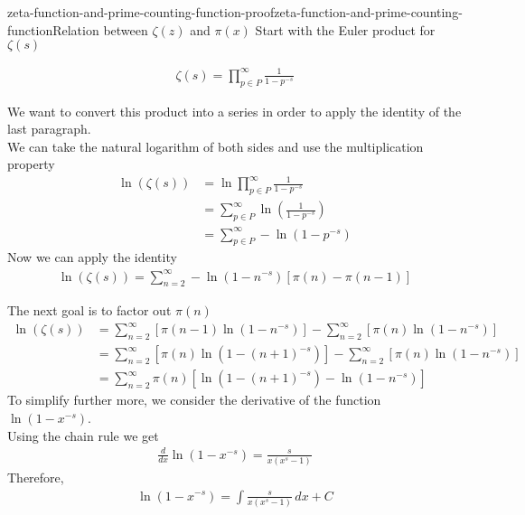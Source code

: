 \documentclass[preview]{standalone}
\begin{document}
\begin{snippetproof}{zeta-function-and-prime-counting-function-proof}{zeta-function-and-prime-counting-function}{Relation between \(\zeta(z)\) and \(\pi(x)\)}
    Start with the Euler product for \(\zeta(s)\)

    \begin{align*}
        \zeta (s)=\prod_{p\in P}^{\infty}\frac{1}{1-p^{-s}}
    \end{align*}
    
    We want to convert this product into a series in order to apply the identity of the last paragraph.
    \\
    We can take the natural logarithm of both sides and use the multiplication property
    \begin{align*}
        \ln\left(\zeta (s)\right)&=\ln\prod_{p\in P}^{\infty}\frac{1}{1-p^{-s}}
        \\
        &=\sum_{p\in P}^{\infty}\ln\left(\frac{1}{1-p^{-s}}\right)
        \\
        &=\sum_{p\in P}^{\infty}-\ln\left(1-p^{-s}\right)
    \end{align*}
    Now we can apply the identity
    \begin{align*}
        \ln\left(\zeta (s)\right)=\sum_{n=2}^{\infty}-\ln\left(1-n^{-s}\right)\left[\pi (n) - \pi (n-1)\right]
    \end{align*}
    
    The next goal is to factor out \(\pi (n)\)
    \begin{align*}
        \ln\left(\zeta(s)\right)
        &=\sum_{n=2}^{\infty}\left[\pi (n-1)\ln\left(1-n^{-s}\right)\right]
        -\sum_{n=2}^{\infty}\left[\pi (n)\ln\left(1-n^{-s}\right)\right]
        \\&=\sum_{n=2}^{\infty}\left[\pi (n)\ln\left(1-{(n+1)}^{-s}\right)\right]
        -\sum_{n=2}^{\infty}\left[\pi (n)\ln\left(1-n^{-s}\right)\right]
        \\
        &=\sum_{n=2}^{\infty}\pi (n)\left[\ln\left(1-{(n+1)}^{-s}\right)-\ln\left(1-n^{-s}\right)\right]
    \end{align*}
    To simplify further more, we consider the derivative of the function \(\ln(1-x^{-s})\).
    \\
    Using the chain rule we get
    \begin{align*}
        \frac{d}{dx}\ln\left(1-x^{-s}\right)=
        \frac{s}{x(x^s-1)}
    \end{align*}
    Therefore,
    \begin{align*}
        \ln\left(1-x^{-s}\right)=
        \int \frac{s}{x(x^s-1)}\,dx+C
    \end{align*}
    

\end{snippetproof}
\end{document}
